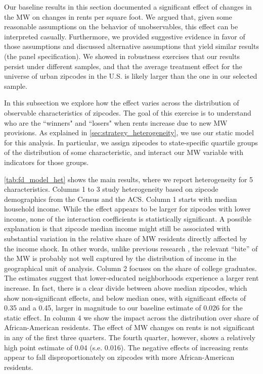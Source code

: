 Our baseline results in this section documented a significant effect of changes in the MW
on changes in rents per square foot. We argued that, given some reasonable assumptions on the 
behavior of unobservables, this effect can be interpreted casually. Furthermore, we provided
suggestive evidence in favor of those assumptions and discussed alternative assumptions 
that yield similar results (the panel specification). We showed in robustness exercises that 
our results persist under different samples, and that the average treatment effect for the 
universe of urban zipcodes in the U.S. is likely larger than the one in our selected sample. 


In this subsection we explore how the effect varies across the distribution of observable 
characteristics of zipcodes. The goal of this exercise is to understand who are the ``winners" 
and ``losers" when rents increase due to new MW provisions. As explained in 
\autoref{sec:strategy_heterogeneity}, we use our static model for this analysis. In particular, 
we assign zipcodes to state-specific quartile groups of the distribution of some characteristic, 
and interact our MW variable with indicators for those groups. 

\autoref{tab:fd_model_het} shows the main results, where we report heterogeneity for 5 
characteristics. Columns 1 to 3 study heterogeneity based on zipcode demographics from the 
Census and the ACS. Column 1 starts with median household income. While the effect appears to 
be larger for zipcodes with lower income, none of the interaction coefficients is statistically 
significant. A possible explanation is that zipcode median income might still be associated 
with substantial variation in the relative share of MW residents directly affected by the income 
shock. In other words, unlike previous research \parencite[e.g.][]{AutorEtAl2016}, the relevant 
``bite'' of the MW is probably not well captured by the distribution of income in the geographical
unit of analysis. Column 2 focuses on the share of college graduates. The estimates suggest that 
lower-educated neighborhoods experience a larger rent increase. In fact, there is a clear divide 
between above median zipcodes, which show non-significant effects, and below median ones, with 
significant effects of 0.35 and a 0.45, larger in magnitude to our baseline estimate of 0.026 for 
the static effect. In column 4 we show the impact across the distribution over share of 
African-American residents. The effect of MW changes on rents is not significant in any of the 
first three quarters. The fourth quarter, however, shows a relatively high point estimate of 
0.04 (s.e. 0.016). The negative effects of increasing rents appear to fall disproportionately 
on zipcodes with more African-American residents.

